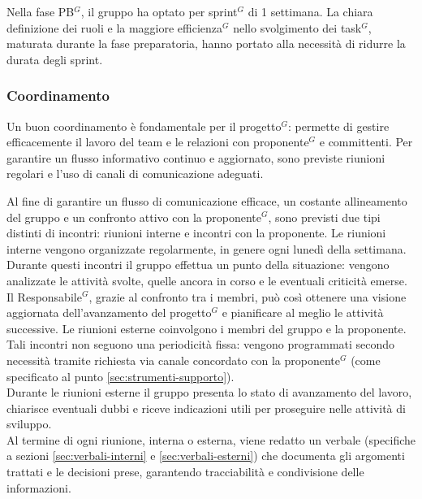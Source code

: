 Nella fase PB$^G$, il gruppo ha optato per sprint$^G$ di 1 settimana. La chiara definizione dei ruoli e la maggiore efficienza$^G$ nello svolgimento dei task$^G$, maturata durante la fase preparatoria, hanno portato alla necessità di ridurre la durata degli sprint.

\subsubsection{Coordinamento}
Un buon coordinamento è fondamentale per il progetto$^G$: permette di gestire efficacemente il lavoro del team e le relazioni con proponente$^G$ e committenti. Per garantire un flusso informativo continuo e aggiornato, sono previste riunioni regolari e l'uso di canali di comunicazione adeguati.

Al fine di garantire un flusso di comunicazione efficace, un costante allineamento del gruppo e un confronto attivo con la proponente$^G$, sono previsti due tipi distinti di incontri: riunioni interne e incontri con la proponente.
Le riunioni interne vengono organizzate regolarmente, in genere ogni lunedì della settimana.\\
Durante questi incontri il gruppo effettua un punto della situazione: vengono analizzate le attività svolte, quelle ancora in corso e le eventuali criticità emerse.\\
Il Responsabile$^G$, grazie al confronto tra i membri, può così ottenere una visione aggiornata dell’avanzamento del progetto$^G$ e pianificare al meglio le attività successive.
Le riunioni esterne coinvolgono i membri del gruppo e la proponente.\\
Tali incontri non seguono una periodicità fissa: vengono programmati secondo necessità tramite richiesta via canale concordato con la proponente$^G$ (come specificato al punto \ref{sec:strumenti-supporto}).\\
Durante le riunioni esterne il gruppo presenta lo stato di avanzamento del lavoro, chiarisce eventuali dubbi e riceve indicazioni utili per proseguire nelle attività di sviluppo.\\
Al termine di ogni riunione, interna o esterna, viene redatto un verbale (specifiche a sezioni \ref{sec:verbali-interni} e \ref{sec:verbali-esterni}) che documenta gli argomenti trattati e le decisioni prese, garantendo tracciabilità e condivisione delle informazioni.

